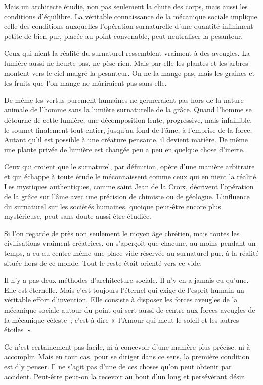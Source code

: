 \documentclass[french,twoside]{book} %
\begin{document}
Mais un architecte étudie, non pas seulement la chute des corps, mais aussi les conditions d'équilibre. La véritable connaissance de la mécanique sociale implique celle des conditions auxquelles l'opération surnaturelle d'une quantité infiniment petite de bien pur, placée au point convenable, peut neutraliser la pesanteur.\par
Ceux qui nient la réalité du surnaturel ressemblent vraiment à des aveugles. La lumière aussi ne heurte pas, ne pèse rien. Mais par elle les plantes et les arbres montent vers le ciel malgré la pesanteur. On ne la mange pas, mais les graines et les fruits que l'on mange ne mûriraient pas sans elle.\par
De même les vertus purement humaines ne germeraient pas hors de la nature animale de l'homme sans la lumière surnaturelle de la grâce. Quand l'homme se détourne de cette lumière, une décomposition lente, progressive, mais infaillible, le soumet finalement tout entier, jusqu'au fond de l'âme, à l'emprise de la force. Autant qu'il est possible à une créature pensante, il devient matière. De même une plante privée de lumière est changée peu a peu en quelque chose d'inerte.\par
Ceux qui croient que le surnaturel, par définition, opère d'une manière arbitraire et qui échappe à toute étude le méconnaissent comme ceux qui en nient la réalité. Les mystiques authentiques, comme saint Jean de la Croix, décrivent l'opération de la grâce sur l'âme avec une précision de chimiste ou de géologue. L'influence du surnaturel sur les sociétés humaines, quoique peut-être encore plus mystérieuse, peut sans doute aussi être étudiée.\par
Si l'on regarde de près non seulement le moyen âge chrétien, mais toutes les civilisations vraiment créatrices, on s'aperçoit que chacune, au moins pendant un temps, a eu au centre même une place vide réservée au surnaturel pur, à la réalité située hors de ce monde. Tout le reste était orienté vers ce vide.\par
Il n'y a pas deux méthodes d'architecture sociale. Il n'y en a jamais eu qu'une. Elle est éternelle. Mais c'est toujours l'éternel qui exige de l'esprit humain un véritable effort d'invention. Elle consiste à disposer les forces aveugles de la mécanique sociale autour du point qui sert aussi de centre aux forces aveugles de la mécanique céleste ; c'est-à-dire « l'Amour qui meut le soleil et les autres étoiles ».\par
Ce n'est certainement pas facile, ni à concevoir d'une manière plus précise. ni à accomplir. Mais en tout cas, pour se diriger dans ce sens, la première condition est d'y penser. Il ne s'agit pas d'une de ces choses qu'on peut obtenir par accident. Peut-être peut-on la recevoir au bout d'un long et persévérant désir.\par
\end{document}
